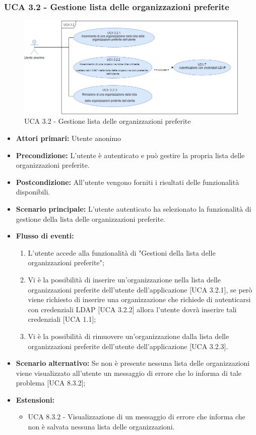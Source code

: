\subsubsection{UCA 3.2 - Gestione lista delle organizzazioni preferite}%
\begin{figure}[h]
	\centering
	\includegraphics[scale=0.45 , center]{sezioni/UseCase/Immagini/UCA3.2.png}
	\caption{UCA 3.2 - Gestione lista delle organizzazioni preferite}
\end{figure}
\begin{itemize}
	\item \textbf{Attori primari:} Utente anonimo
	\item \textbf{Precondizione:} L'utente è autenticato e può gestire la propria lista delle organizzazioni preferite.
	\item \textbf{Postcondizione:} All'utente vengono forniti i risultati delle funzionalità disponibili.
	\item \textbf{Scenario principale:} L'utente autenticato ha selezionato la funzionalità di gestione della lista delle organizzazioni preferite.
	\item \textbf{Flusso di eventi:}
			\begin{enumerate}
			\item L'utente accede alla funzionalità di "Gestioni della lista delle organizzazioni\ap{G} preferite";
			\item Vi è la possibilità di inserire un'organizzazione nella lista delle organizzazioni\ap{G} preferite dell'utente dell'applicazione [UCA 3.2.1], se però viene richiesto di inserire una organizzazione che richiede di autenticarsi con credenziali LDAP [UCA 3.2.2] allora l'utente dovrà inserire tali credenziali [UCA 1.1];
			\item Vi è la possibilità di rimuovere un'organizzazione dalla lista delle organizzazioni\ap{G} preferite dell'utente dell'applicazione [UCA 3.2.3].
			\end{enumerate}
	\item \textbf{Scenario alternativo:} Se non è presente nessuna lista delle organizzazioni viene visualizzato all'utente un messaggio di errore che lo informa di tale problema [UCA 8.3.2];
	\item \textbf{Estensioni:}
	\begin{itemize}
		\item UCA 8.3.2 - Visualizzazione di un messaggio di errore che informa che non è salvata nessuna lista delle organizzazioni.
	\end{itemize}
\end{itemize}

